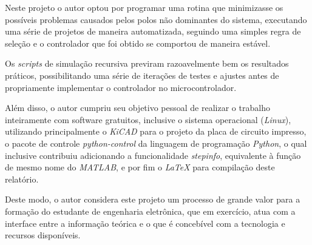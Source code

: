 \documentclass[
	12pt,				%
	article,			%
	openright,			%
	oneside,
	a4paper,			%
	chapter=TITLE,		%
	section=TITLE,		%
	english,			%
	french,				%
	spanish,			%
	brazil,				%
]{abntex2}
\begin{document}
        Neste projeto o autor optou por programar uma rotina que minimizasse os possíveis problemas causados pelos polos não dominantes do sistema, executando uma série de projetos de maneira automatizada, seguindo uma simples regra de seleção e o controlador que foi obtido se comportou de maneira estável.
        
        Os \textit{scripts} de simulação recursiva previram razoavelmente bem os resultados práticos, possibilitando uma série de iterações de testes e ajustes antes de propriamente implementar o controlador no microcontrolador.
        
        Além disso, o autor cumpriu seu objetivo pessoal de realizar o trabalho inteiramente com software gratuitos, inclusive o sistema operacional (\textit{Linux}), utilizando principalmente o \textit{KiCAD} para o projeto da placa de circuito impresso, o pacote de controle \textit{python-control} da linguagem de programação \textit{Python}, o qual inclusive contribuiu adicionando a funcionalidade \textit{stepinfo}, equivalente à função de mesmo nome do \textit{MATLAB}, e por fim o \textit{LaTeX} para compilação deste relatório.
     
        Deste modo, o autor considera este projeto um processo de grande valor para a formação do estudante de engenharia eletrônica, que em exercício, atua com a interface entre a informação teórica e o que é concebível com a tecnologia e recursos disponíveis.
    
    
	
	

	\postextual
	
	
	
	
\end{document}

